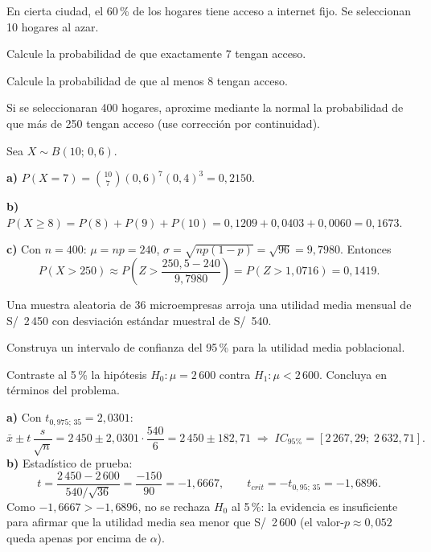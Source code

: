 \documentclass{evaluacion}
\begin{document}
\begin{ejercicio}[7][Probabilidad]
En cierta ciudad, el 60\,\% de los hogares tiene acceso a internet fijo.
Se seleccionan 10 hogares al azar.
\begin{apartados}
  \item Calcule la probabilidad de que exactamente 7 tengan acceso. 
  \item Calcule la probabilidad de que al menos 8 tengan acceso. 
  \item Si se seleccionaran 400 hogares, aproxime mediante la normal la
        probabilidad de que más de 250 tengan acceso (use corrección por
        continuidad). 
\end{apartados}
\espaciorespuesta{7cm}
\begin{solucion}
Sea $X\sim B(10;\,0{,}6)$.

\textbf{a)} $P(X=7) = \binom{10}{7}(0{,}6)^{7}(0{,}4)^{3} = 0{,}2150$.

\textbf{b)} $P(X\ge 8) = P(8)+P(9)+P(10) =
0{,}1209 + 0{,}0403 + 0{,}0060 = 0{,}1673$.

\textbf{c)} Con $n=400$: $\mu = np = 240$,
$\sigma = \sqrt{np(1-p)} = \sqrt{96} = 9{,}7980$. Entonces
\[
  P(X > 250) \approx P\!\left(Z > \frac{250{,}5 - 240}{9{,}7980}\right)
  = P(Z > 1{,}0716) = 0{,}1419.
\]
\end{solucion}
\end{ejercicio}

\begin{ejercicio}[7][Inferencia]
Una muestra aleatoria de 36 microempresas arroja una utilidad media
mensual de S/~2\,450 con desviación estándar muestral de S/~540.
\begin{apartados}
  \item Construya un intervalo de confianza del 95\,\% para la utilidad
        media poblacional. 
  \item Contraste al 5\,\% la hipótesis $H_0\colon \mu = 2\,600$ contra
        $H_1\colon \mu < 2\,600$. Concluya en términos del problema. 
\end{apartados}
\espaciorespuesta{7cm}
\begin{solucion}
\textbf{a)} Con $t_{0{,}975;\,35} = 2{,}0301$:
\[
  \bar{x} \pm t\,\frac{s}{\sqrt{n}}
  = 2\,450 \pm 2{,}0301\cdot\frac{540}{6}
  = 2\,450 \pm 182{,}71
  \;\Rightarrow\; IC_{95\%} = [2\,267{,}29;\; 2\,632{,}71].
\]
\textbf{b)} Estadístico de prueba:
\[
  t = \frac{2\,450 - 2\,600}{540/\sqrt{36}} = \frac{-150}{90} = -1{,}6667,
  \qquad t_{crit} = -t_{0{,}95;\,35} = -1{,}6896.
\]
Como $-1{,}6667 > -1{,}6896$, no se rechaza $H_0$ al 5\,\%: la evidencia
es insuficiente para afirmar que la utilidad media sea menor que
S/~2\,600 (el valor-$p\approx 0{,}052$ queda apenas por encima de
$\alpha$).
\end{solucion}
\end{ejercicio}

\findelexamen
\end{document}
